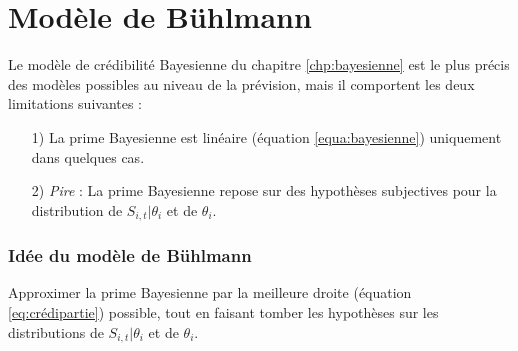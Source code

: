 \chapter{Modèle de Bühlmann}

Le modèle de crédibilité Bayesienne du chapitre \ref{chp:bayesienne} est le plus précis des modèles possibles au niveau de la prévision, mais il comportent les deux limitations suivantes :
\begin{itemize}
\item[1)] La prime Bayesienne est linéaire (équation \ref{equa:bayesienne}) uniquement dans quelques cas.
\item[2)] \emph{Pire} : La prime Bayesienne repose sur des hypothèses subjectives pour la distribution de $S_{i,t}|\theta_i$ et de $\theta_i$.
\end{itemize}
\subsection*{Idée du modèle de Bühlmann}
Approximer la prime Bayesienne par la meilleure droite (équation \ref{eq:crédipartie}) possible, tout en faisant tomber les hypothèses sur les distributions de $S_{i,t}|\theta_i$ et de $\theta_i$.

